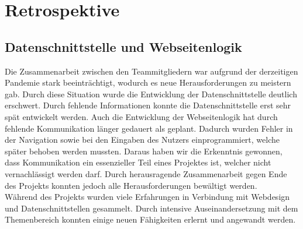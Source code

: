 \chapter{Retrospektive}

\section{Datenschnittstelle und Webseitenlogik}
Die Zusammenarbeit zwischen den Teammitgliedern war aufgrund der derzeitigen Pandemie stark beeinträchtigt, wodurch es neue Herausforderungen zu meistern gab. Durch diese Situation wurde die Entwicklung der Datenschnittstelle deutlich erschwert. Durch fehlende Informationen konnte die Datenschnittstelle erst sehr spät entwickelt werden. Auch die Entwicklung der Webseitenlogik hat durch fehlende Kommunikation länger gedauert als geplant. Dadurch wurden Fehler in der Navigation sowie bei den Eingaben des Nutzers einprogrammiert, welche später behoben werden mussten. Daraus haben wir die Erkenntnis gewonnen, dass Kommunikation ein essenzieller Teil eines Projektes ist, welcher nicht vernachlässigt werden darf. Durch herausragende Zusammenarbeit gegen Ende des Projekts konnten jedoch alle Herausforderungen bewältigt werden.\\
Während des Projekts wurden viele Erfahrungen in Verbindung mit Webdesign und Datenschnittstellen gesammelt. Durch intensive Auseinandersetzung mit dem Themenbereich konnten einige neuen Fähigkeiten erlernt und angewandt werden.
